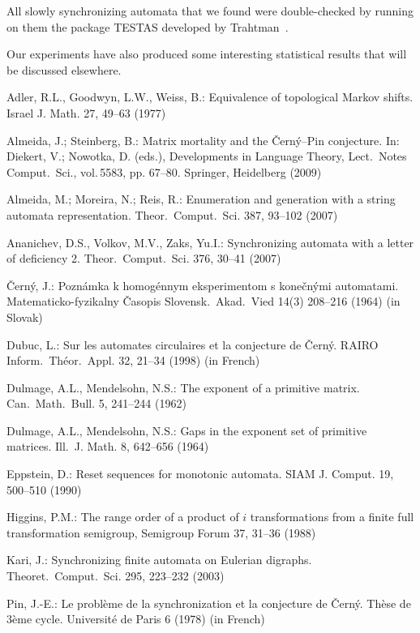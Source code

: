 \documentclass[11pt]{llncs}
\begin{document}
All slowly synchronizing automata that we found were double-checked by running on
them the package TESTAS developed by Trahtman~\cite{Tr06}.

Our experiments have also produced some interesting statistical results that will
be discussed elsewhere.

\begin{thebibliography}{99}
Adler, R.L., Goodwyn, L.W., Weiss, B.: Equivalence of topological Markov shifts.
Israel J. Math. 27, 49--63 (1977)

Almeida, J.; Steinberg, B.: Matrix mortality and the \v{C}ern\'{y}--Pin
conjecture. In:  Diekert, V.; Nowotka, D. (eds.), Developments in
Language Theory, Lect.\ Notes Comput.\ Sci., vol.\,5583, pp. 67--80.
Springer, Heidelberg (2009)

Almeida, M.; Moreira, N.; Reis, R.: Enumeration and generation with a string
automata representation. Theor.\ Comput.\ Sci. 387, 93--102 (2007)

Ananichev, D.S., Volkov, M.V., Zaks, Yu.I.: Synchronizing automata
with a letter of deficiency 2. Theor.\ Comput.\ Sci. 376, 30--41 (2007)

\v{C}ern\'{y}, J.: Pozn\'{a}mka k homog\'{e}nnym eksperimentom s
kone\v{c}n\'{y}mi automatami. Matematicko-fyzikalny \v{C}asopis
Slovensk.\ Akad.\ Vied 14(3) 208--216 (1964) (in Slovak)

Dubuc, L.: Sur les automates circulaires et la conjecture de
\v{C}ern\'y. RAIRO Inform.\ Th\'eor.\ Appl. 32, 21--34 (1998) (in
French)

Dulmage, A.L., Mendelsohn, N.S.: The exponent of a primitive matrix.
Can.\ Math.\ Bull. 5, 241--244 (1962)

Dulmage, A.L., Mendelsohn, N.S.: Gaps in the exponent set of primitive
matrices. Ill.\ J. Math. 8, 642--656 (1964)

Eppstein, D.: Reset sequences for monotonic automata. SIAM J.
Comput. 19, 500--510 (1990)

Higgins, P.M.: The range order of a product of $i$ transformations
from a finite full transformation semigroup, Semigroup Forum 37, 31--36
(1988)

Kari, J.: Synchronizing finite automata on Eulerian digraphs.
Theoret.\ Comput.\ Sci. 295, 223--232 (2003)

Pin, J.-E.: Le probl\`eme de la synchronization et la conjecture de
\v{C}ern\'y. Th\`ese de 3\`eme cycle. Universit\'e de Paris 6 (1978) (in
French)


\end{thebibliography}
\end{document}
